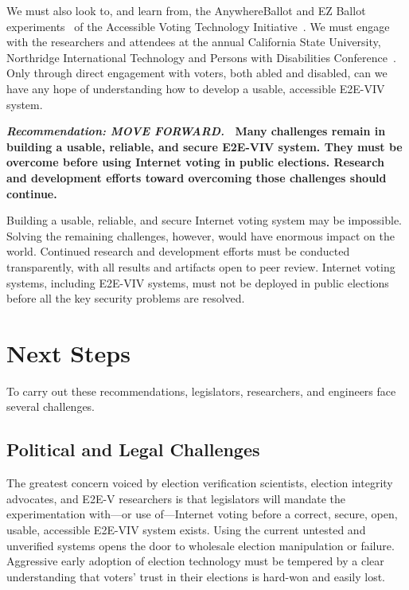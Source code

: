 We must also look to, and learn from, the AnywhereBallot and EZ Ballot
experiments~\cite{AnywhereBallot,lee2012ez} of the Accessible Voting
Technology Initiative~\cite{AVTI}.  We must engage with the
researchers and attendees at the annual California State University,
Northridge International Technology and Persons with Disabilities
Conference~\cite{CSUN}. Only through direct engagement with voters,
both abled and disabled, can we have any hope of understanding how to
develop a usable, accessible E2E-VIV system.

\vspace{12pt} 

\textbf{\emph{Recommendation: MOVE FORWARD.} \ Many challenges remain
  in building a usable, reliable, and secure E2E-VIV system. They must
  be overcome before using Internet voting in public
  elections. Research and development efforts toward overcoming those
  challenges should continue.}

Building a usable, reliable, and secure Internet voting system may be
impossible. Solving the remaining challenges, however, would have
enormous impact on the world. Continued research and development
efforts must be conducted transparently, with all results and
artifacts open to peer review. Internet voting systems, including
E2E-VIV systems, must not be deployed in public elections before all
the key security problems are resolved.

\section{Next Steps}
\label{sec:next-steps}

To carry out these recommendations, legislators, researchers, and
engineers face several challenges.

\subsection{Political and Legal Challenges}

The greatest concern voiced by election verification scientists,
election integrity advocates, and E2E-V researchers is that
legislators will mandate the experimentation with---or use
of---Internet voting before a correct, secure, open, usable,
accessible E2E-VIV system exists. Using the current untested and
unverified systems opens the door to wholesale election manipulation
or failure. Aggressive early adoption of election technology must be
tempered by a clear understanding that voters' trust in their
elections is hard-won and easily lost.

